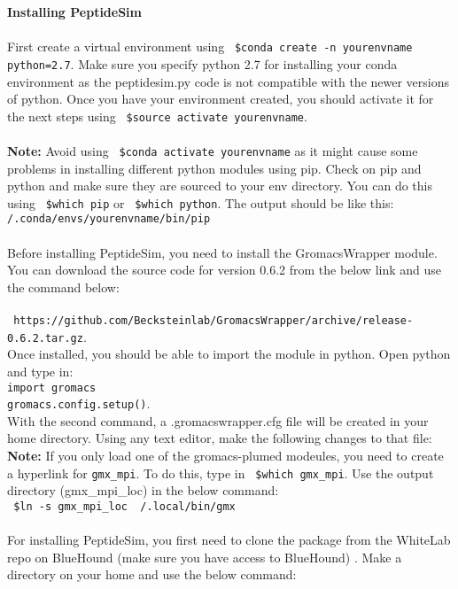 \documentclass [12pt] {article}
\begin{document}
\noindent	\textbf{Installing PeptideSim} 
\\\\ \indent First create a virtual environment using { \color{blue} \texttt{  \$conda create -n yourenvname python=2.7}}. Make sure you specify python 2.7 for installing your conda environment as the peptidesim.py code is not compatible with the newer versions of python. Once you have your environment created, you should activate it for the next steps using {\color{blue} \texttt{  \$source activate yourenvname}}.
\\\\ \textbf{Note:} Avoid using {\color{blue} \texttt{  \$conda activate yourenvname}} as it might cause some problems in installing different python modules using pip. Check on pip and python and make sure they are sourced to your env directory. You can do this using {\color{blue} \texttt{ \$which pip}} or {\color{blue} \texttt{ \$which python}}. The output should be like this: \texttt{ /.conda/envs/yourenvname/bin/pip}
\\\\ \indent Before installing PeptideSim, you need to install the GromacsWrapper module. You can download the source code for version 0.6.2 from the below link and use the command below: \\ \\ \texttt{ https://github.com/Becksteinlab/GromacsWrapper/archive/release-0.6.2.tar.gz}.
\\ Once installed, you should be able to import the module in python. Open python and type in:
 \\  {\color{blue} \texttt{\indent import  gromacs \\ \indent
 gromacs.config.setup()}}.
 \\ With the second command, a .gromacswrapper.cfg file will be created in your home directory. Using any text editor, make the following changes to that file:\\ 
 {}
 \noindent
  \textbf{Note:} If you only load one of the gromacs-plumed modeules, you need to create a hyperlink for \texttt{gmx\_mpi}. To do this, type in {\color{blue} \texttt{ \$which gmx\_mpi}}. Use the output directory (gmx\_mpi\_loc) in the below command:\\
  {\color{blue} \texttt{ \$ln -s gmx\_mpi\_loc ~/.local/bin/gmx}}
 \\\\For installing PeptideSim, you first need to clone the package from the WhiteLab repo on BlueHound (make sure you have access to BlueHound) . Make a directory on your home and use the below command:\\
\end{document}
